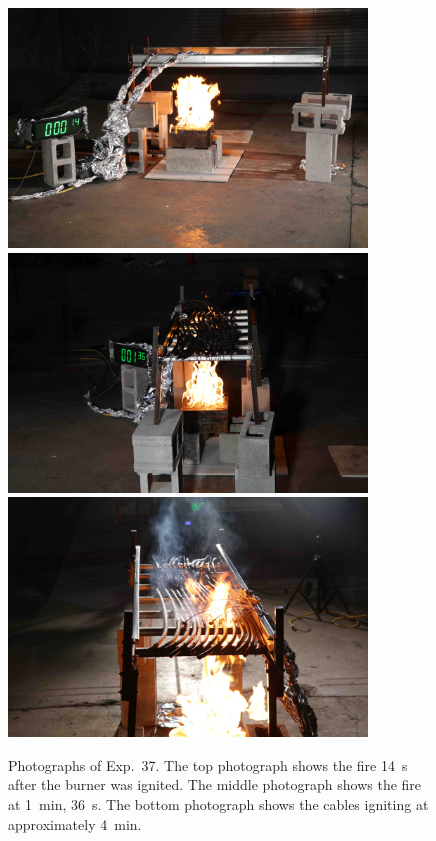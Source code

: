 \begin{figure}[p]
\centering
\includegraphics[height=2.50in]{../FIGURES/Test_37_side} \\ \vspace{0.1in}
\includegraphics[height=2.50in]{../FIGURES/Test_37_1_min_36_s} \\ \vspace{0.1in}
\includegraphics[height=2.50in]{../FIGURES/Test_37_ignition}
\caption[Photographs of Exp.~37]{Photographs of Exp.~37. The top photograph shows the fire 14~s after the burner was ignited. The middle photograph shows the fire at 1~min, 36~s. The bottom photograph shows the cables igniting at approximately 4~min.}
\label{fig:Test_37_photos}
\end{figure}


